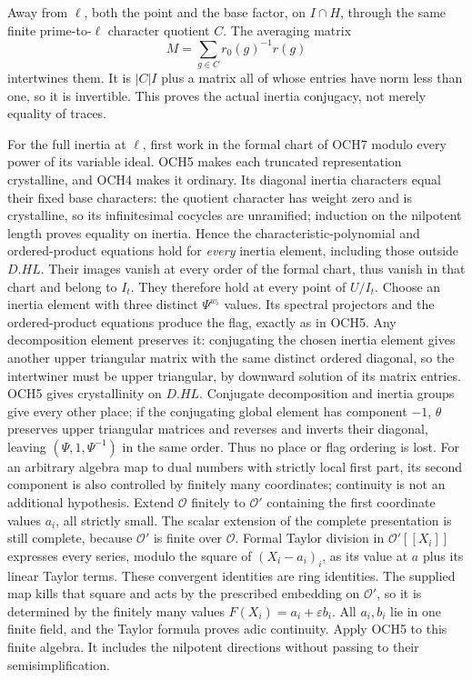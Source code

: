 \documentclass[11pt,a4paper]{article}
\numberwithin{equation}{section}
\theoremstyle{remark}\newtheorem{remark}[theorem]{Remark}
\begin{document}
Away from \(\ell\), both the point and the base factor, on
\(I\cap H\), through the same finite prime-to-\(\ell\)
character quotient \(C\).  The averaging matrix
\[
              M=\sum_{g\in C}r_0(g)^{-1}r(g)
\]
intertwines them.  It is \(|C|I\) plus a matrix all of whose
entries have norm less than one, so it is invertible.  This proves
the actual inertia conjugacy, not merely equality of traces.

For the full inertia at \(\ell\), first work in the formal
chart of OCH7 modulo every power of its variable ideal.  OCH5
makes each truncated representation crystalline, and OCH4 makes
it ordinary.  Its diagonal inertia characters equal their fixed
base characters: the quotient character has weight zero and is
crystalline, so its infinitesimal cocycles are unramified; induction
on the nilpotent length proves equality on inertia.  Hence the
characteristic-polynomial and ordered-product equations hold for
\emph{every} inertia element, including those outside \(D.HL\).
Their images vanish at every order of the formal chart, thus vanish
in that chart and belong to \(I_t\).  They therefore hold at
every point of \(U/I_t\).
Choose an inertia element with three distinct \(\Psi^{w_i}\)
values.  Its spectral projectors and the ordered-product equations
produce the flag, exactly as in OCH5.  Any decomposition element
preserves it: conjugating the chosen inertia element gives another
upper triangular matrix with the same distinct ordered diagonal,
so the intertwiner must be upper triangular, by downward solution
of its matrix entries.  OCH5 gives crystallinity on \(D.HL\).
Conjugate decomposition and inertia groups give every other place;
if the conjugating global element has component \(-1\),
\(\theta\) preserves upper triangular matrices and reverses
and inverts their diagonal, leaving \((\Psi,1,\Psi^{-1})\)
in the same order.  Thus no place or flag ordering is lost.
For an arbitrary algebra map to dual numbers with strictly local
first part, its second component is also controlled by finitely many
coordinates; continuity is not an additional hypothesis.  Extend
\(\mathcal O\) finitely to \(\mathcal O'\) containing
the first coordinate values \(a_i\), all strictly small.
The scalar extension of the complete presentation is still complete,
because \(\mathcal O'\) is finite over \(\mathcal O\).
Formal Taylor division in \(\mathcal O'[[X_i]]\) expresses
every series, modulo the square of \((X_i-a_i)_i\), as its
value at \(a\) plus its linear Taylor terms.  These convergent
identities are ring identities.  The supplied map kills that square
and acts by the prescribed embedding on \(\mathcal O'\),
so it is determined by the finitely many values
\(F(X_i)=a_i+\varepsilon b_i\).  All \(a_i,b_i\) lie in
one finite field, and the Taylor formula proves adic continuity.
Apply OCH5 to this finite algebra.  It includes the nilpotent
directions without passing to their semisimplification.
\end{document}
